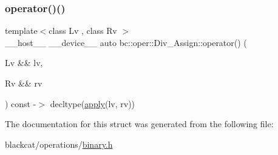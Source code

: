 \mbox{\label{structbc_1_1oper_1_1Div__Assign_a7c0a7d535ddd10949839fad279d746af}} 
\subsubsection{\texorpdfstring{operator()()}{operator()()}}
{\footnotesize\ttfamily template$<$class Lv , class Rv $>$ \\
\+\_\+\+\_\+host\+\_\+\+\_\+ \+\_\+\+\_\+device\+\_\+\+\_\+ auto bc\+::oper\+::\+Div\+\_\+\+Assign\+::operator() (\begin{DoxyParamCaption}\item[{Lv \&\&}]{lv,  }\item[{Rv \&\&}]{rv }\end{DoxyParamCaption}) const -\/$>$ decltype(\hyperlink{structbc_1_1oper_1_1Div__Assign_a0baa46adbdde01c10dd58ce3d02bc62f}{apply}(lv, rv)) \hspace{0.3cm}{\ttfamily [inline]}}



The documentation for this struct was generated from the following file\+:\begin{DoxyCompactItemize}
\item 
blackcat/operations/\hyperlink{binary_8h}{binary.\+h}\end{DoxyCompactItemize}
